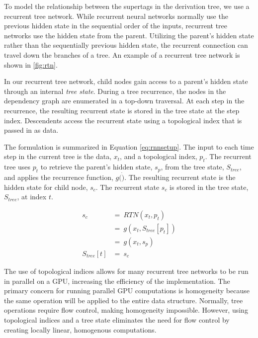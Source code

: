 \documentclass[11pt]{article}
\begin{document}
To model the relationship between the supertags in the derivation tree, we use
a recurrent tree network.
%
While recurrent neural networks normally use the previous hidden state in the sequential order of the inputs,
recurrent tree networks use the hidden state from the parent.
%
Utilizing the parent's hidden state rather than the sequentially previous hidden
state, the recurrent connection can travel down the branches of a tree.
%
An example of a recurrent tree network is shown in \ref{fig:rtn}.



In our recurrent tree network, child nodes gain access to a parent's hidden state
through an internal \emph{tree state}.
%
During a tree recurrence, the nodes in the dependency graph are enumerated in a
top-down traversal.
%
At each step in the recurrence, the resulting recurrent state is stored in the
tree state at the step index.
%
Descendents access the recurrent state using a topological index that is passed in as data.

The formulation is summarized in Equation \ref{eq:rnnsetup}.
%
The input to each time step in the current tree is the data, $x_t$, and a topological
index, $p_t$.
%
The recurrent tree uses $p_t$ to retrieve the parent's hidden state, $s_p$, from the
tree state, $S_{tree}$, and applies the recurrence function, $g(\dot)$.
%
The resulting recurrent state is the hidden state for child node, $s_c$.
%
The recurrent state $s_c$ is stored in the tree state, $S_{tree}$, at index $t$.

\begin{align}
       s_c~&=~RTN(x_t,p_t) \nonumber \\
           &=~g(x_t,S_{tree}[p_t]) \nonumber \\
           &=~g(x_t, s_p) \nonumber \\
S_{tree}[t]&=~s_c \label{eq:rnnsetup}
\end{align}

The use of topological indices allows for many recurrent tree networks to be
run in parallel on a GPU, increasing the efficiency of the implementation.
%
The primary concern for running parallel GPU computations is homogeneity because
the same operation will be applied to the entire data structure.
%
Normally, tree operations require flow control, making homogeneity impossible.
%
However, using topological indices and a tree state eliminates the need for flow control
by creating locally linear, homogenous computations.
\end{document}
